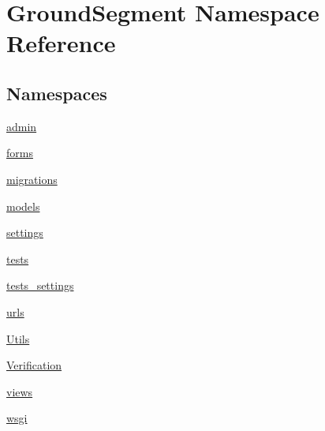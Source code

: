 \hypertarget{namespace_ground_segment}{}\section{Ground\+Segment Namespace Reference}
\label{namespace_ground_segment}
\subsection*{Namespaces}
\begin{DoxyCompactItemize}
\item 
 \hyperlink{namespace_ground_segment_1_1admin}{admin}
\item 
 \hyperlink{namespace_ground_segment_1_1forms}{forms}
\item 
 \hyperlink{namespace_ground_segment_1_1migrations}{migrations}
\item 
 \hyperlink{namespace_ground_segment_1_1models}{models}
\item 
 \hyperlink{namespace_ground_segment_1_1settings}{settings}
\item 
 \hyperlink{namespace_ground_segment_1_1tests}{tests}
\item 
 \hyperlink{namespace_ground_segment_1_1tests__settings}{tests\+\_\+settings}
\item 
 \hyperlink{namespace_ground_segment_1_1urls}{urls}
\item 
 \hyperlink{namespace_ground_segment_1_1_utils}{Utils}
\item 
 \hyperlink{namespace_ground_segment_1_1_verification}{Verification}
\item 
 \hyperlink{namespace_ground_segment_1_1views}{views}
\item 
 \hyperlink{namespace_ground_segment_1_1wsgi}{wsgi}
\end{DoxyCompactItemize}
